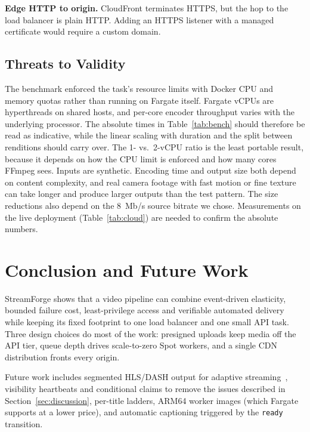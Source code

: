 \documentclass[conference]{IEEEtran}
\begin{document}
\textbf{Edge HTTP to origin.} CloudFront terminates HTTPS, but the hop to the load balancer is plain HTTP. Adding an HTTPS listener with a managed certificate would require a custom domain.

\subsection{Threats to Validity}\label{sec:validity}
The benchmark enforced the task's resource limits with Docker CPU and memory quotas rather than running on Fargate itself. Fargate vCPUs are hyperthreads on shared hosts, and per-core encoder throughput varies with the underlying processor. The absolute times in Table~\ref{tab:bench} should therefore be read as indicative, while the linear scaling with duration and the split between renditions should carry over. The 1- vs.\ 2-vCPU ratio is the least portable result, because it depends on how the CPU limit is enforced and how many cores FFmpeg sees. Inputs are synthetic. Encoding time and output size both depend on content complexity, and real camera footage with fast motion or fine texture can take longer and produce larger outputs than the test pattern. The size reductions also depend on the 8~Mb/s source bitrate we chose. Measurements on the live deployment (Table~\ref{tab:cloud}) are needed to confirm the absolute numbers.

\section{Conclusion and Future Work}\label{sec:conclusion}
StreamForge shows that a video pipeline can combine event-driven elasticity, bounded failure cost, least-privilege access and verifiable automated delivery while keeping its fixed footprint to one load balancer and one small API task. Three design choices do most of the work: presigned uploads keep media off the API tier, queue depth drives scale-to-zero Spot workers, and a single CDN distribution fronts every origin.

Future work includes segmented HLS/DASH output for adaptive streaming~\cite{stockhammer2011dash}, visibility heartbeats and conditional claims to remove the issues described in Section~\ref{sec:discussion}, per-title ladders, ARM64 worker images (which Fargate supports at a lower price), and automatic captioning triggered by the \texttt{ready} transition.
\end{document}
